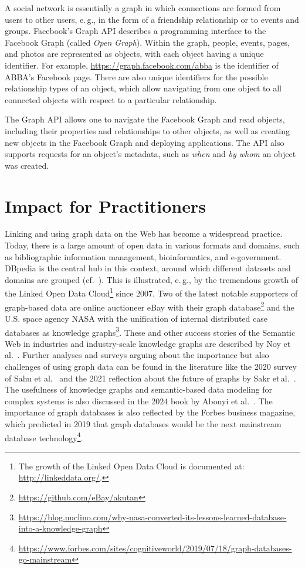 \documentclass[a4paper,USenglish]{tgdk-v2021}
\begin{document}
A social network is essentially a graph in which connections are formed from users to other users, e.\,g., in the form of a friendship relationship or to events and groups.
Facebook's Graph API describes a programming interface to the Facebook Graph (called \textit{Open Graph}).
Within the graph, people, events, pages, and photos are represented as objects, with each object having a unique identifier.
For example, \url{https://graph.facebook.com/abba} is the identifier of ABBA's Facebook page.
There are also unique identifiers for the possible relationship types of an object, which allow navigating from one object to all connected objects with respect to a particular relationship.

The Graph API allows one to navigate the Facebook Graph and read objects, including their properties and relationships to other objects, as well as creating new objects in the Facebook Graph and deploying applications.
The API also supports requests for an object's metadata,
such as \textit{when} and \textit{by whom} an object was created.

\section{Impact for Practitioners}
\label{sec:praxis}
\label{sec:impact}

Linking and using graph data on the Web has become a widespread practice. 
Today, there is a large amount of open data in various formats and domains, such as bibliographic information management, bioinformatics, and e-government.
DBpedia is the central hub in this context, around which different datasets and domains are grouped (cf.~\cite{DBLP:journals/expert/Bizer09}).
This is illustrated, e.\,g., by the tremendous growth of the Linked Open Data Cloud\footnote{The growth of the Linked Open Data Cloud is documented at: \url{http://linkeddata.org/}.} since 2007.
Two of the latest notable supporters of graph-based data are online auctioneer eBay with their graph database\footnote{\url{https://github.com/eBay/akutan}} and the U.S. space agency NASA with the unification of internal distributed case databases as knowledge graphs\footnote{\url{https://blog.nuclino.com/why-nasa-converted-its-lessons-learned-database-into-a-knowledge-graph}}.
These and other success stories of the Semantic Web in industries and industry-scale knowledge graphs are described by Noy et al.~\cite{DBLP:journals/cacm/NoyGJNPT19}.
Further analyses and surveys arguing about the importance but also challenges of using graph data can be found in the literature like the 2020 survey of Sahu et al.~\cite{DBLP:journals/vldb/SahuMSLO20} and the 2021 reflection about the future of graphs by Sakr et\,al.~\cite{DBLP:journals/cacm/SakrBVIAAAABBDV21}.
The usefulness of knowledge graphs and semantic-based data modeling for complex systems is also discussed in the 2024 book by Abonyi et al.~\cite{AbonyiEtAl2024OntologiesInIndustry}.
%
The importance of graph databases is also reflected by the Forbes business magazine, which predicted in 2019 that graph databases would be the next mainstream database technology\footnote{\url{https://www.forbes.com/sites/cognitiveworld/2019/07/18/graph-databases-go-mainstream}}.
\end{document}
